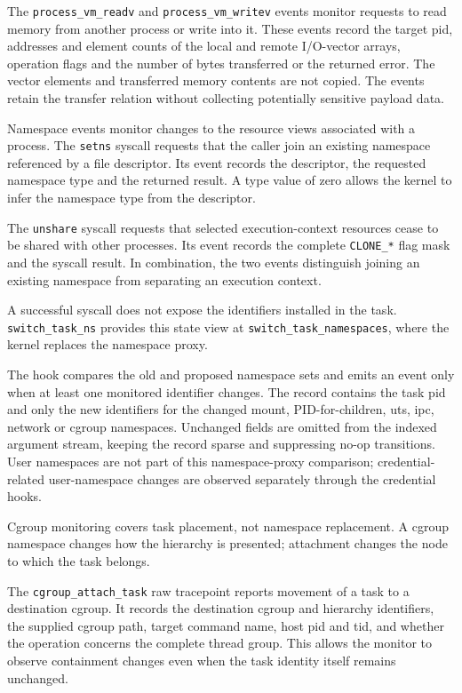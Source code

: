 The \texttt{process\_vm\_readv} and \texttt{process\_vm\_writev}
events monitor requests to read memory from another process or write
into it. These events 
record the target \gls{pid}, addresses and element counts of the local and remote
I/O-vector arrays, operation flags and the number of bytes transferred or the
returned error. The vector elements and transferred memory contents are not
copied. The events retain the transfer relation without collecting potentially
sensitive payload data.

Namespace events monitor changes to the resource views associated with a
process. The \texttt{setns} syscall requests that the caller join an existing
namespace referenced by a file descriptor. Its event records the descriptor,
the requested namespace type and the returned result. A type value of zero
allows the kernel to infer the namespace type from the descriptor.

The \texttt{unshare} syscall requests that selected execution-context
resources cease to be shared with other processes. Its event records the
complete \texttt{CLONE\_*} flag mask and the syscall result. In combination,
the two events distinguish joining an existing namespace from separating an
execution context.

A successful syscall does not expose the identifiers installed in the task.
\texttt{switch\_task\_ns} provides this state view at
\texttt{switch\_task\_namespaces}, where the kernel replaces the namespace
proxy.

The hook compares the old and proposed namespace sets and emits an event only
when at least one monitored identifier changes. The record contains the task
\gls{pid} and only the new identifiers for the changed mount, PID-for-children, \gls{uts},
\gls{ipc}, network or cgroup namespaces. Unchanged fields are omitted from the
indexed argument stream, keeping the record sparse and suppressing no-op
transitions. User namespaces are not part of this namespace-proxy comparison;
credential-related user-namespace changes are observed separately through the
credential hooks.

Cgroup monitoring covers task placement, not namespace replacement. A cgroup
namespace changes how the hierarchy is presented; attachment changes the node
to which the task belongs.

The \texttt{cgroup\_attach\_task} raw tracepoint reports movement of a task to
a destination cgroup. It records the destination cgroup and hierarchy
identifiers, the supplied cgroup path, target command name, host \gls{pid} and \gls{tid},
and whether the operation concerns the complete thread group. This allows the
monitor to observe containment changes even when the task identity itself
remains unchanged.

